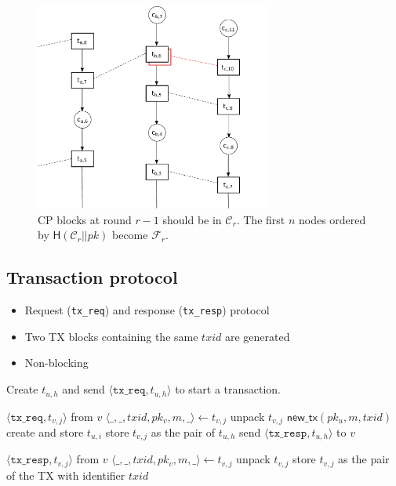 \documentclass{beamer}
\begin{document}
\begin{frame}{\subsecname}
  \begin{figure}[h]
  \includegraphics[width=0.7\textwidth]{trustchain-4}
  \centering
  \caption{CP blocks at round $r-1$ should be in $\mathcal{C}_r$.
  The first $n$ nodes ordered by $\textsf{H}(\mathcal{C}_r || pk)$ become $\mathcal{F}_r$.}
  \end{figure}
\end{frame}

\subsection{Transaction protocol}
\begin{frame}{\subsecname}
\begin{itemize}
\item Request (\texttt{tx\_req}) and response (\texttt{tx\_resp}) protocol
\item Two TX blocks containing the same $txid$ are generated
\item Non-blocking
\end{itemize}
\end{frame}

\begin{frame}{\subsecname}
Create $t_{u, h}$ and send $\langle \texttt{tx\_req}, t_{u, h} \rangle$ to start a transaction.
\vspace{5 mm}
\begin{algorithmic}
    \Upon $\langle \texttt{tx\_req}, t_{v, j} \rangle$ from $v$
    \State $\langle \_, \_, txid, pk_v, m, \_ \rangle \gets t_{v, j}$ \Comment unpack $t_{v, j}$
    \State $\textsf{new\_tx}(pk_u, m, txid)$ \Comment create and store $t_{u, i}$
    \State store $t_{v, j}$ as the pair of $t_{u, h}$
    \State send $\langle \texttt{tx\_resp}, t_{u, h} \rangle$ to $v$

    \Upon $\langle \texttt{tx\_resp}, t_{v, j} \rangle$ from $v$  
    \State $\langle \_, \_, txid, pk_v, m, \_ \rangle \gets t_{v, j}$ \Comment unpack $t_{v, j}$
    \State store $t_{v, j}$ as the pair of the TX with identifier $txid$
\end{algorithmic}
\end{frame}
\end{document}
